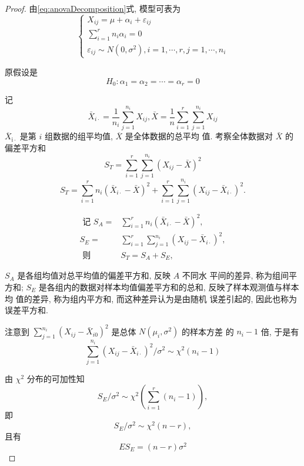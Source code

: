 \begin{proof}
    由\cref{eq:anovaDecomposition}式, 模型可表为
    $$
    \left\{\begin{array}{l}
    {X}_{i j}=\mu+\alpha_{i}+\varepsilon_{i j} \\
    \sum_{i=1}^{r} {n}_{i} \alpha_{i}={0} \\
    \varepsilon_{i j} \sim N\left({0}, \sigma^{2}\right), i=1, \cdots, r, j=1, \cdots, n_{i}
    \end{array}\right.
    $$
    
    原假设是
    $$
    H_{0}: \alpha_{1}=\alpha_{2}=\cdots=\alpha_{r}=0
    $$
    
    记
    $$
    \bar{X}_{i \cdot}=\frac{1}{n_{i}} \sum_{j=1}^{n_{i}} X_{i j}, \bar{X}=\frac{1}{n} \sum_{i=1}^{r} \sum_{j=1}^{n_{i}} X_{i j}
    $$
    \( \overline{{X}}_{\mathrm{i} \cdot} \) 是第 \( {i} \) 组数据的组平均值, \( \overline{{X}} \) 是全体数据的总平均
    值. 考察全体数据对 \( \bar{X} \) 的偏差平方和
    $$
    S_{T}=\sum_{i=1}^{r} \sum_{j=1}^{n_{i}}\left(X_{i j}-\bar{X}\right)^{2}
    $$
    $$
    S_{T}=\sum_{i=1}^{r} n_{i}\left(\bar{X}_{i \cdot}-\bar{X}\right)^{2}+\sum_{i=1}^{r} \sum_{j=1}^{n_{i}}\left(X_{i j}-\bar{X}_{i \cdot}\right)^{2} .
    $$
    
    $$ \begin{aligned} \text { 记 } S_{A}=& \sum_{i=1}^{r} n_{i}\left(\bar{X}_{i \cdot}-\bar{X}\right)^{2}, \\ S_{E}=& \sum_{i=1}^{r} \sum_{j=1}^{n_{i}}\left(X_{i j}-\bar{X}_{i \cdot}\right)^{2}, \\ \text { 则 } & S_{T}=S_{A}+S_{E}, \end{aligned} $$
    
    \( {S}_{{A}} \) 是各组均值对总平均值的偏差平方和, 反映 \( {A} \) 不同水
    平间的差异, 称为组间平方和; \( {S}_{E} \) 是各组内的数据对样本均值偏差平方和的总和, 反映了样本观测值与样本均
    值的差异, 称为组内平方和, 而这种差异认为是由随机
    误差引起的, 因此也称为误差平方和. 
    
    注意到 \( \sum_{j=1}^{n_{i}}\left(X_{i j}-\bar{X}_{i 0}\right)^{2} \) 是总体 \( N\left(\mu_{i}, \sigma^{2}\right) \) 的样本方差
    的 \( {n}_{{i}}-{1} \) 倍, 于是有
    $$
    \sum_{j=1}^{n_{i}}\left(X_{i j}-\bar{X}_{i \cdot}\right)^{2} / \sigma^{2} \sim \chi^{2}\left(n_{i}-1\right)
    $$
    
    由 \( \chi^{2} \) 分布的可加性知
    $$
    S_{E} / \sigma^{2} \sim \chi^{2}\left(\sum_{i=1}^{r}\left(n_{i}-1\right)\right),
    $$
    即
    $$
    {S}_{E} / \sigma^{2} \sim \chi^{2}({n}-{r}),
    $$
    且有
    $$
    E S_{E}=(n-r) \sigma^{2}
    $$
    

\end{proof}
